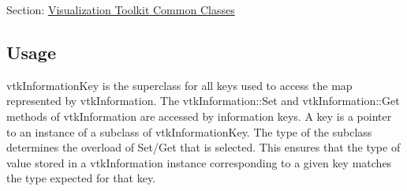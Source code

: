 Section\-: \hyperlink{sec_vtkcommon}{Visualization Toolkit Common Classes} \hypertarget{vtkwidgets_vtkxyplotwidget_Usage}{}\subsection{Usage}\label{vtkwidgets_vtkxyplotwidget_Usage}
vtk\-Information\-Key is the superclass for all keys used to access the map represented by vtk\-Information. The vtk\-Information\-::\-Set and vtk\-Information\-::\-Get methods of vtk\-Information are accessed by information keys. A key is a pointer to an instance of a subclass of vtk\-Information\-Key. The type of the subclass determines the overload of Set/\-Get that is selected. This ensures that the type of value stored in a vtk\-Information instance corresponding to a given key matches the type expected for that key.

